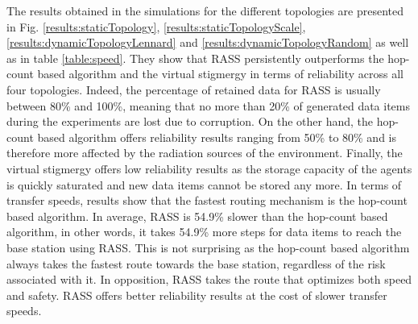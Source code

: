 The results obtained in the simulations for the different topologies are presented in Fig. \ref{results:staticTopology}, \ref{results:staticTopologyScale}, \ref{results:dynamicTopologyLennard} and \ref{results:dynamicTopologyRandom} as well as in table \ref{table:speed}. They show that RASS persistently outperforms the hop-count based algorithm and the virtual stigmergy in terms of reliability across all four topologies. Indeed, the percentage of retained data for RASS is usually between 80\% and 100\%, meaning that no more than 20\% of generated data items during the experiments are lost due to corruption. On the other hand, the hop-count based algorithm offers reliability results ranging from 50\% to 80\% and is therefore more affected by the radiation sources of the environment. Finally, the virtual stigmergy offers low reliability results as the storage capacity of the agents is quickly saturated and new data items cannot be stored any more. In terms of transfer speeds, results show that the fastest routing mechanism is the hop-count based algorithm. In average, RASS is 54.9\% slower than the hop-count based algorithm, in other words, it takes 54.9\% more steps for data items to reach the base station using RASS. This is not surprising as the hop-count based algorithm always takes the fastest route towards the base station, regardless of the risk associated with it. In opposition, RASS takes the route that optimizes both speed and safety. RASS offers better reliability results at the cost of slower transfer speeds.  

